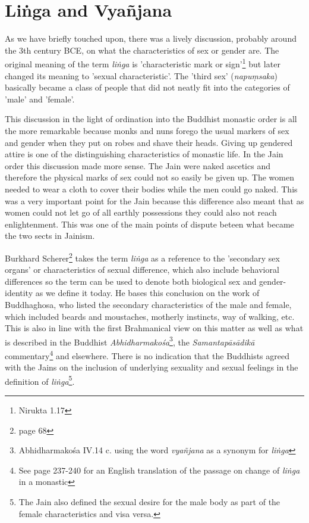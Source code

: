 \section{Liṅga and Vyañjana}
\label{linga}

As we have briefly touched upon, there was a lively discussion, probably around the 3th century BCE, on what the characteristics of sex or gender are. The original meaning of the term {\em liṅga} is 'characteristic mark or sign'\footnote{Nirukta 1.17} but later changed its meaning to 'sexual characteristic'. The 'third sex' ({\em napuṃsaka}) basically became a class of people that did not neatly fit into the categories of 'male' and 'female'. 

This discussion in the light of ordination into the Buddhist monastic order is all the more remarkable because monks and nuns forego the usual markers of sex and gender when they put on robes and shave their heads. Giving up gendered attire is one of the distinguishing characteristics of monastic life. In the Jain order this discussion made more sense. The Jain were naked ascetics and therefore the physical marks of sex could not so easily be given up. The women needed to wear a cloth to cover their bodies while the men could go naked. This was a very important point for the Jain because this difference also meant that as women could not let go of all earthly possessions they could also not reach enlightenment. This was one of the main points of dispute beteen what became the two sects in Jainism.

Burkhard Scherer\footnote{\cite{scherer} page 68} takes the term {\em liṅga} as a reference to the 'secondary sex organs' or characteristics of sexual difference, which also include behavioral differences so the term can be used to denote both biological sex and gender-identity as we define it today. He bases this conclusion on the work of Buddhaghosa, who listed the secondary characteristics of the male and female, which included beards and moustaches, motherly instincts, way of walking, etc. This is also in line with the first Brahmanical view on this matter as well as what is described in the Buddhist {\em Abhidharmakośa}\footnote{Abhidharmakośa IV.14 c. using the word {\em vyañjana} as a synonym for {\em liṅga}}, the {\em Samantapāsādikā} commentary\footnote{See \cite{anderson2016} page 237-240 for an English translation of the passage on change of {\em liṅga} in a monastic} and elsewhere. There is no indication that the Buddhists agreed with the Jains on the inclusion of underlying sexuality and sexual feelings in the definition of {\em liṅga}\footnote{The Jain also defined the sexual desire for the male body as part of the female characteristics and visa versa.}.
